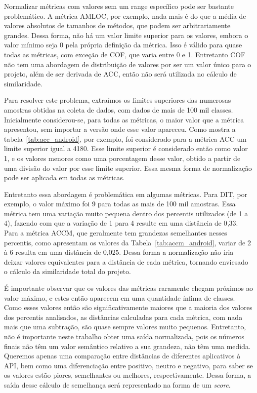 Normalizar métricas com valores sem um range específico pode ser bastante problemático. A métrica AMLOC, por exemplo, nada mais é do que a média de valores absolutos de tamanhos de métodos, que podem ser arbitrariamente grandes. Dessa forma, não há um valor limite superior para os valores, embora o valor mínimo seja 0 pela própria definição da métrica. Isso é válido para quase todas as métricas, com exceção de COF, que varia entre 0 e 1. Entretanto COF não tem uma abordagem de distribuição de valores por ser um valor único para o projeto, além de ser derivada de ACC, então não será utilizada no cálculo de similaridade.

Para resolver este problema, extraímos os limites superiores das numerosas amostras obtidas na coleta de dados, com dados de mais de 100 mil classes. Inicialmente considerou-se, para todas as métricas, o maior valor que a métrica apresentou, sem importar a versão onde esse valor apareceu. Como mostra a tabela~\ref{tab:acc_android}, por exemplo, foi considerado para a métrica ACC um limite superior igual a 4180. Esse limite superior é considerado então como valor 1, e os valores menores como uma porcentagem desse valor, obtido a partir de uma divisão do valor por esse limite superior. Essa mesma forma de normalização pode ser aplicada em todas as métricas. 

Entretanto essa abordagem é problemática em algumas métricas. Para DIT, por exemplo, o valor máximo foi 9 para todas as mais de 100 mil amostras. Essa métrica tem uma variação muito pequena dentro dos percentis utilizados (de 1 a 4), fazendo com que a variação de 1 para 4 resulte em uma distância de 0,33. Para a métrica ACCM, que geralmente tem grandezas semelhantes nesses percentis, como apresentam os valores da Tabela~\ref{tab:accm_android}, variar de 2 à 6 resulta em uma distância de 0,025. Dessa forma a normalização não iria deixar valores equivalentes para a distância de cada métrica, tornando enviesado o cálculo da similaridade total do projeto.

É importante observar que os valores das métricas raramente chegam próximos ao valor máximo, e estes então aparecem em uma quantidade ínfima de classes. Como esses valores então são significativamente maiores que a maioria dos valores dos percentis analisados, as distâncias calculadas para cada métrica, com nada mais que uma subtração, são quase sempre valores muito pequenos. Entretanto, não é importante neste trabalho obter uma saída normalizada, pois os números finais não têm um valor semântico relativo a sua grandeza, não têm uma medida. Queremos apenas uma comparação entre distâncias de diferentes aplicativos à API, bem como uma diferenciação entre positivo, neutro e negativo, para saber se os valores estão piores, semelhantes ou melhores, respectivamente. Dessa forma, a saída desse cálculo de semelhança será representado na forma de um \textit{score}.

